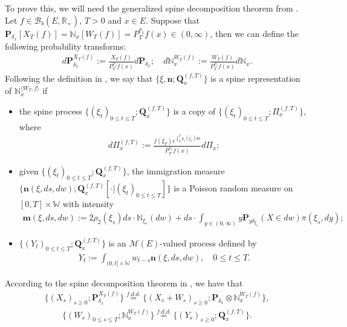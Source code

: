 \documentclass[12pt,a4paper]{amsart}
\theoremstyle{plain}
\theoremstyle{definition}
\numberwithin{equation}{section}
\begin{document}
To prove this, we will need the generalized spine decomposition theorem from \cite{RenSongSun2017Spine}.
Let $f\in \mathcal B_b(E,\mathbb R_+)$, $T >0$ and $x\in E$.
Suppose that $\mathbf P_{\delta_x}[X_T(f)] = \mathbb N_x[ W_T(f)] = P^{\rho_1}_T f(x) \in (0,\infty)$, then we can define the following probability transforms:
\begin{align}
  d\mathbf P_{\delta_x}^{ X_T(f)}
  := \frac{X_T(f)}{P_T^{\rho_1} f(x)} d\mathbf P_{\delta_x};
  \quad d\mathbb N_x^{W_T(f)}
  :=  \frac{W_T(f)}{P_T^{\rho_1} f(x)} d\mathbb N_x.
\end{align}
Following the definition in \cite{RenSongSun2017Spine}, we say that $\{\xi, \mathbf n;\mathbf Q_{x}^{(f,T)}\}$ is a spine representation of $\mathbb N_x^{\langle W_T, f\rangle}$ if
\begin{itemize}
\item
  the spine process $\{(\xi_t)_{0\leq t\leq T}; \mathbf Q^{(f,T)}_x\}$ is a copy of $\{(\xi_t)_{0\leq t\leq T}; \Pi^{(f,T)}_{x}\}$, where
  \begin{align}
    d\Pi_x^{(f,T)}
    := \frac{f(\xi_T)e^{\int_0^T \rho_1(\xi_s)ds}}{P^{\rho_1}_T f(x)} d \Pi_x;
  \end{align}
\item
  given $\{(\xi_t)_{0\leq t\leq T}; \mathbf Q^{(f,T)}_x\}$, the immigration measure
$
  \{\mathbf n(\xi,ds,dw); \mathbf Q^{(f,T)}_x[\cdot |(\xi_t)_{0\leq t\leq T}]\}
$
is a Poisson random measure on $[0,T] \times \mathbb W$ with intensity
\begin{align}
  \label{eq: conditional intensity}
  \mathbf m(\xi,ds,dw)
  := 2 \rho_2(\xi_s) ds \cdot \mathbb N_{\xi_s}(dw) + ds \cdot \int_{y\in (0,\infty)} y \mathbf P_{y\delta_{\xi_s}}(X\in dw) \pi(\xi_s,dy);
\end{align}
\item
  $\{(Y_t)_{0\leq t\leq T}; \mathbf Q^{(f,T)}_x\}$ is an $\mathcal M(E)$-valued process defined by
  \begin{align}
    Y_t
    := \int_{(0,t] \times \mathbb W} w_{t-s} \mathbf n(\xi,ds,dw),
    \quad 0 \leq t\leq T.
  \end{align}
\end{itemize}
According to the spine decomposition theorem in \cite{RenSongSun2017Spine}, we have that
\begin{align}
  \label{eq: Spine decomposition 1}
  \{(X_s)_{s \geq 0};\mathbf P_{\delta_x}^{X_T(f)}\}
  \overset{f.d.d.}{=} \{(X_s + W_s)_{s \geq 0};\mathbf P_{\delta_x} \otimes \mathbb N_x^{W_T(f)} \},
\end{align}
\begin{align}
  \label{eq: Spine decomposition 2}
  \{(W_s)_{0\leq s\leq T};\mathbb N_x^{W_T(f)}\}
  \overset{f.d.d.}{=} \{(Y_s)_{s \geq 0};\mathbf Q_x^{(f,T)}\}.
\end{align}
\end{document}

